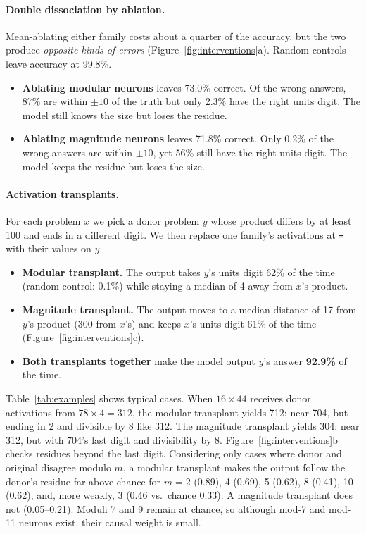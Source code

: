 \documentclass[11pt]{article}
\newcommand{\eq}{\texttt{=}}
\begin{document}
\paragraph{Double dissociation by ablation.} Mean-ablating either family costs about a quarter of the accuracy, but the two produce \emph{opposite kinds of errors} (Figure~\ref{fig:interventions}a). Random controls leave accuracy at 99.8\%.
\begin{itemize}[leftmargin=1.2em,itemsep=1pt]
  \item \textbf{Ablating modular neurons} leaves 73.0\% correct. Of the wrong answers, 87\% are within $\pm10$ of the truth but only 2.3\% have the right units digit. The model still knows the size but loses the residue.
  \item \textbf{Ablating magnitude neurons} leaves 71.8\% correct. Only 0.2\% of the wrong answers are within $\pm10$, yet 56\% still have the right units digit. The model keeps the residue but loses the size.
\end{itemize}

\paragraph{Activation transplants.} For each problem $x$ we pick a donor problem $y$ whose product differs by at least 100 and ends in a different digit. We then replace one family's activations at \eq{} with their values on $y$.
\begin{itemize}[leftmargin=1.2em,itemsep=1pt]
  \item \textbf{Modular transplant.} The output takes $y$'s units digit 62\% of the time (random control: 0.1\%) while staying a median of 4 away from $x$'s product.
  \item \textbf{Magnitude transplant.} The output moves to a median distance of 17 from $y$'s product (300 from $x$'s) and keeps $x$'s units digit 61\% of the time (Figure~\ref{fig:interventions}c).
  \item \textbf{Both transplants together} make the model output $y$'s answer \textbf{92.9\%} of the time.
\end{itemize}
Table~\ref{tab:examples} shows typical cases. When $16\times44$ receives donor activations from $78\times4=312$, the modular transplant yields 712: near 704, but ending in 2 and divisible by 8 like 312. The magnitude transplant yields 304: near 312, but with 704's last digit and divisibility by 8. Figure~\ref{fig:interventions}b checks residues beyond the last digit. Considering only cases where donor and original disagree modulo $m$, a modular transplant makes the output follow the donor's residue far above chance for $m=2$ (0.89), 4 (0.69), 5 (0.62), 8 (0.41), 10 (0.62), and, more weakly, 3 (0.46 vs.\ chance 0.33). A magnitude transplant does not (0.05--0.21). Moduli 7 and 9 remain at chance, so although mod-7 and mod-11 neurons exist, their causal weight is small.
\end{document}
